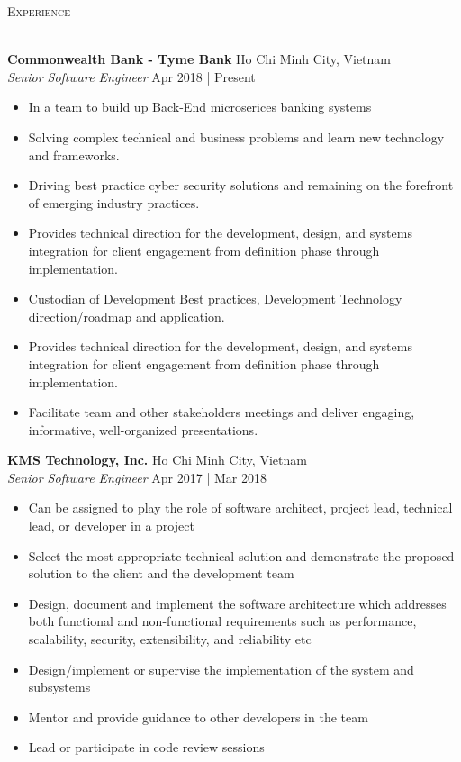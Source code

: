 \documentclass[a4paper]{article}
\newcommand{\lineunder} {
    \vspace*{-8pt} \\
    \hspace*{-18pt} \hrulefill \\
}
\newcommand{\header} [1] {
    {\hspace*{-18pt}\vspace*{6pt} \textsc{#1}}
    \vspace*{-6pt} \lineunder
}
\begin{document}
\newpage

\header{Experience}
\vspace{1mm}

\textbf{Commonwealth Bank - Tyme Bank} \hfill Ho Chi Minh City, Vietnam\\
\textit{Senior Software Engineer} \hfill Apr 2018 | Present\\
\vspace{-1mm}
\begin{itemize} \itemsep 1pt
	\item In a team to build up Back-End microserices banking systems
	\item Solving complex technical and business problems and learn new technology and frameworks.
	\item Driving best practice cyber security solutions and remaining on the forefront of emerging industry practices.
	\item Provides technical direction for the development, design, and systems integration for client engagement from definition phase through implementation.
	\item Custodian of Development Best practices, Development Technology direction/roadmap and application.
	\item Provides technical direction for the development, design, and systems integration for client engagement from definition phase through implementation.
	\item Facilitate team and other stakeholders meetings and deliver engaging, informative, well-organized presentations.
\end{itemize}
\textbf{KMS Technology, Inc.} \hfill Ho Chi Minh City, Vietnam\\
\textit{Senior Software Engineer} \hfill Apr 2017 | Mar 2018\\
\vspace{-1mm}
\begin{itemize} \itemsep 1pt
	\item Can be assigned to play the role of software architect, project lead, technical lead, or developer in a project
	\item Select the most appropriate technical solution and demonstrate the proposed solution to the client and the development team
	\item Design, document and implement the software architecture which addresses both functional and non-functional requirements such as performance, scalability, security, extensibility, and reliability etc
	\item Design/implement or supervise the implementation of the system and subsystems
	\item Mentor and provide guidance to other developers in the team
	\item Lead or participate in code review sessions
\end{itemize}
\end{document}

